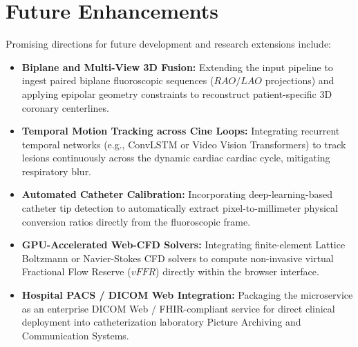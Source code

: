 \section{Future Enhancements}
Promising directions for future development and research extensions include:
\begin{itemize}
    \item \textbf{Biplane and Multi-View 3D Fusion:} Extending the input pipeline to ingest paired biplane fluoroscopic sequences ($RAO/LAO$ projections) and applying epipolar geometry constraints to reconstruct patient-specific 3D coronary centerlines.
    \item \textbf{Temporal Motion Tracking across Cine Loops:} Integrating recurrent temporal networks (e.g., ConvLSTM or Video Vision Transformers) to track lesions continuously across the dynamic cardiac cardiac cycle, mitigating respiratory blur.
    \item \textbf{Automated Catheter Calibration:} Incorporating deep-learning-based catheter tip detection to automatically extract pixel-to-millimeter physical conversion ratios directly from the fluoroscopic frame.
    \item \textbf{GPU-Accelerated Web-CFD Solvers:} Integrating finite-element Lattice Boltzmann or Navier-Stokes CFD solvers to compute non-invasive virtual Fractional Flow Reserve ($vFFR$) directly within the browser interface.
    \item \textbf{Hospital PACS / DICOM Web Integration:} Packaging the microservice as an enterprise DICOM Web / FHIR-compliant service for direct clinical deployment into catheterization laboratory Picture Archiving and Communication Systems.
\end{itemize}
